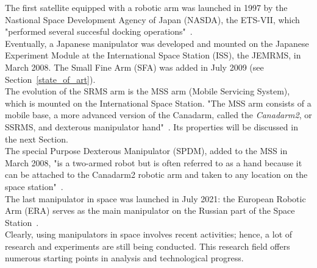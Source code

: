 \documentclass[a4paper,12pt,oneside]{report}
\begin{document}
The first satellite equipped with a robotic arm was launched in 1997 by the Nastional Space Development Agency of Japan (NASDA), the ETS-VII, which "performed several succesful docking operations"~\cite{six}.\\
Eventually, a Japanese manipulator was developed and mounted on the Japanese Experiment Module at the International Space Station (ISS), the JEMRMS, in March 2008. The Small Fine Arm (SFA) was added in July 2009 (see Section~\ref{state_of_art}).\\
The evolution of the SRMS arm is the MSS arm (Mobile Servicing System), which is mounted on the International Space Station. "The MSS arm consists of a mobile base, a more advanced version of the Canadarm, called the \textit{Canadarm2}, or SSRMS, and dexterous manipulator hand"~\cite{six}. Its properties will be discussed in the next Section.\\
The special Purpose Dexterous Manipulator (SPDM), added to the MSS in March 2008, "is a two-armed robot but is often referred to as a hand because it can be attached to the Canadarm2 robotic arm and taken to any location on the space station"~\cite{six}.\\
The last manipulator in space was launched in July 2021: the European Robotic Arm (ERA) serves as the main manipulator on the Russian part of the Space Station~\cite{esa}.\\
Clearly, using manipulators in space involves recent activities; hence, a lot of research and experiments are still being conducted. This research field offers numerous starting points in analysis and technological progress.
\newpage
\end{document}
